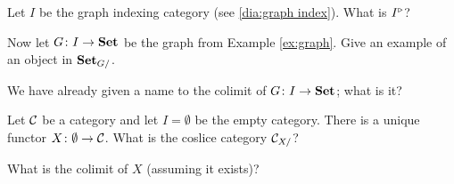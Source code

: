 \documentclass[CT4S-EN-RU]{subfiles}
\begin{document}
\begin{exerciseENG}
Let $I$ be the graph indexing category (see \ref{dia:graph index}).
\sexc What is $I^\triangleright$?
\item Now let $G\colon I\rightarrow{\bf Set}$ be the graph from Example \ref{ex:graph}. Give an example of an object in ${\bf Set}_{G/}$. 
\item We have already given a name to the colimit of $G\colon I\rightarrow{\bf Set}$; what is it?
\endsexc
\end{exerciseENG}

\begin{exerciseRUS}
\end{exerciseRUS}

\begin{exerciseENG}\label{exc:initial as colimit}
Let $\mathcal{C}$ be a category and let $I=\emptyset$ be the empty category. There is a unique functor $X\colon\emptyset\rightarrow\mathcal{C}$.
\sexc What is the coslice category $\mathcal{C}_{X/}$?
\item What is the colimit of $X$ (assuming it exists)?
\endsexc
\end{exerciseENG}

\begin{exerciseRUS}\label{exc:initial as colimit}
\end{exerciseRUS}
\end{document}
